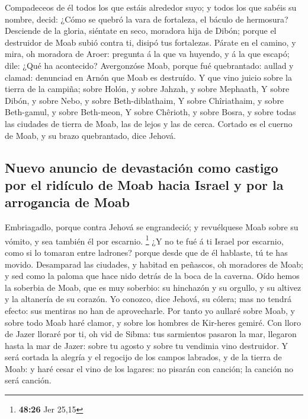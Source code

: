 Compadeceos de él todos los que estáis alrededor suyo; y
todos los que sabéis su nombre, decid: ¿Cómo se quebró la vara de
fortaleza, el báculo de hermosura?  Desciende de la gloria,
siéntate en seco, moradora hija de Dibón; porque el destruidor de Moab
subió contra ti, disipó tus fortalezas.  Párate en el
camino, y mira, oh moradora de Aroer: pregunta á la que va huyendo, y á
la que escapó; dile: ¿Qué ha acontecido?  Avergonzóse Moab,
porque fué quebrantado: aullad y clamad: denunciad en Arnón que Moab es
destruído.  Y que vino juicio sobre la tierra de la
campiña; sobre Holón, y sobre Jahzah, y sobre Mephaath,  Y
sobre Dibón, y sobre Nebo, y sobre Beth-diblathaim,  Y
sobre Chîriathaim, y sobre Beth-gamul, y sobre Beth-meon, 
Y sobre Chêrioth, y sobre Bosra, y sobre todas las ciudades de tierra de
Moab, las de lejos y las de cerca.  Cortado es el cuerno de
Moab, y su brazo quebrantado, dice Jehová.

\hypertarget{nuevo-anuncio-de-devastaciuxf3n-como-castigo-por-el-riduxedculo-de-moab-hacia-israel-y-por-la-arrogancia-de-moab}{%
\subsection{Nuevo anuncio de devastación como castigo por el ridículo de
Moab hacia Israel y por la arrogancia de
Moab}\label{nuevo-anuncio-de-devastaciuxf3n-como-castigo-por-el-riduxedculo-de-moab-hacia-israel-y-por-la-arrogancia-de-moab}}

 Embriagadlo, porque contra Jehová se engrandeció; y
revuélquese Moab sobre su vómito, y sea también él por escarnio.
\footnote{\textbf{48:26} Jer 25,15}  ¿Y no te fué á ti
Israel por escarnio, como si lo tomaran entre ladrones? porque desde que
de él hablaste, tú te has movido.  Desamparad las ciudades,
y habitad en peñascos, oh moradores de Moab; y sed como la paloma que
hace nido detrás de la boca de la caverna.  Oído hemos la
soberbia de Moab, que es muy soberbio: su hinchazón y su orgullo, y su
altivez y la altanería de su corazón.  Yo conozco, dice
Jehová, su cólera; mas no tendrá efecto: sus mentiras no han de
aprovecharle.  Por tanto yo aullaré sobre Moab, y sobre
todo Moab haré clamor, y sobre los hombres de Kir-heres gemiré.
 Con lloro de Jazer lloraré por ti, oh vid de Sibma: tus
sarmientos pasaron la mar, llegaron hasta la mar de Jazer: sobre tu
agosto y sobre tu vendimia vino destruidor.  Y será cortada
la alegría y el regocijo de los campos labrados, y de la tierra de Moab:
y haré cesar el vino de los lagares: no pisarán con canción; la canción
no será canción.

